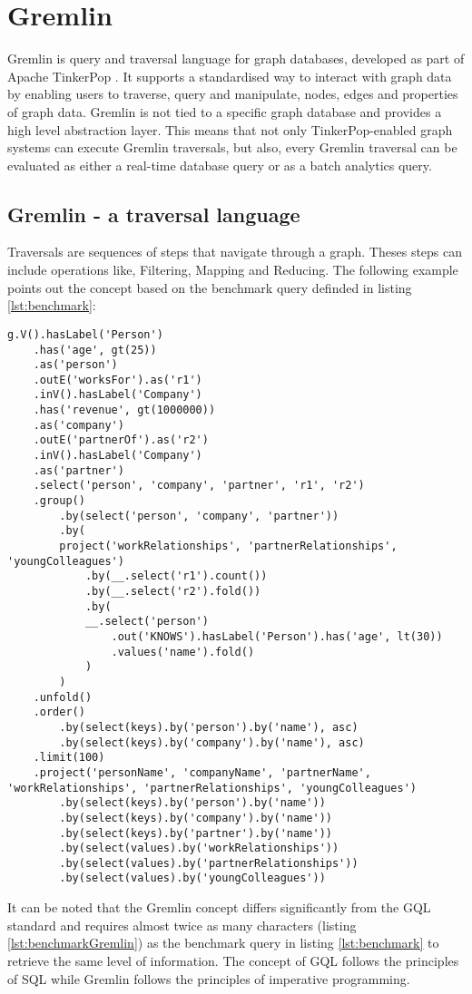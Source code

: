 \section{Gremlin}
\label{sec:different_query_languages_for_graph_databases:gremlin}
Gremlin is query and traversal language for graph databases, developed as part of Apache TinkerPop \citep{apache_gremlin_2024}.
It supports a standardised way to interact with graph data by enabling users to traverse, query and
manipulate, 
nodes, edges and properties of graph data. 
Gremlin is not tied to a specific graph database and provides a high level abstraction layer.
This means that not only TinkerPop-enabled graph systems can execute Gremlin traversals, 
but also, every Gremlin traversal can be evaluated as either a real-time database query
or as a batch analytics query. 

\subsection{Gremlin - a traversal language}
Traversals are sequences of steps that navigate through a graph. Theses steps can include operations
like, Filtering, Mapping and Reducing.
The following example points out the concept based on the benchmark query definded in listing \ref{lst:benchmark}:
\begin{lstlisting}[caption={Benchmark Query in Gremlin}, label={lst:benchmarkGremlin}] 
	g.V().hasLabel('Person')
	.has('age', gt(25))
	.as('person')
	.outE('worksFor').as('r1')
	.inV().hasLabel('Company')
	.has('revenue', gt(1000000))
	.as('company')
	.outE('partnerOf').as('r2')
	.inV().hasLabel('Company')
	.as('partner')
	.select('person', 'company', 'partner', 'r1', 'r2')
	.group()
		.by(select('person', 'company', 'partner'))
		.by(
		project('workRelationships', 'partnerRelationships', 'youngColleagues')
			.by(__.select('r1').count())
			.by(__.select('r2').fold())
			.by(
			__.select('person')
				.out('KNOWS').hasLabel('Person').has('age', lt(30))
				.values('name').fold()
			)
		)
	.unfold()
	.order()
		.by(select(keys).by('person').by('name'), asc)
		.by(select(keys).by('company').by('name'), asc)
	.limit(100)
	.project('personName', 'companyName', 'partnerName', 'workRelationships', 'partnerRelationships', 'youngColleagues')
		.by(select(keys).by('person').by('name'))
		.by(select(keys).by('company').by('name'))
		.by(select(keys).by('partner').by('name'))
		.by(select(values).by('workRelationships'))
		.by(select(values).by('partnerRelationships'))
		.by(select(values).by('youngColleagues'))
\end{lstlisting}
It can be noted that the Gremlin concept differs significantly 
from the GQL standard and requires almost twice as many characters (listing \ref{lst:benchmarkGremlin})
as the benchmark query in listing \ref{lst:benchmark} to retrieve the same level of information.
The concept of GQL follows the principles of SQL while Gremlin follows 
the principles of imperative programming.
